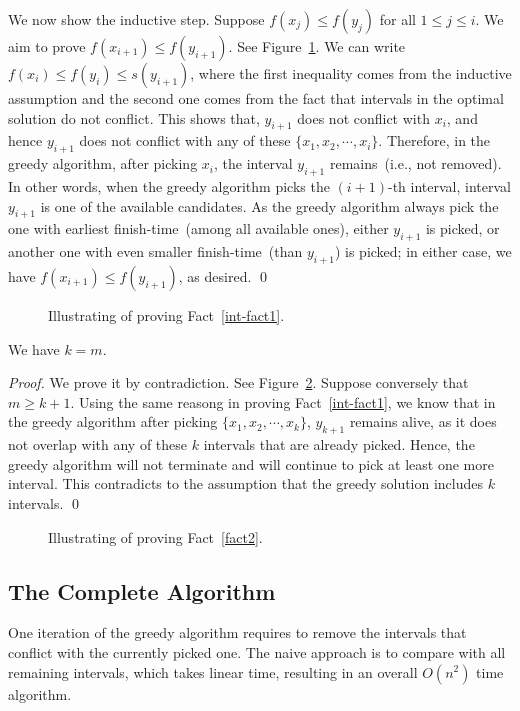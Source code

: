 We now show the inductive step. Suppose $f(x_j) \le f(y_j)$ for all $1\le j \le i$.
We aim to prove $f(x_{i+1}) \le f(y_{i+1})$. 
See Figure~\ref{fig:inductive}.
We can write $f(x_i) \le f(y_i) \le s(y_{i+1})$, 
   where the first inequality comes from the inductive assumption
   and the second one comes from the fact that intervals in the optimal solution do not conflict.
This shows that, $y_{i+1}$ does not conflict with $x_i$,
and hence $y_{i+1}$ does not conflict with any of these $\{x_1, x_2, \cdots, x_i\}$.
Therefore, in the greedy algorithm, after picking $x_i$, the interval $y_{i+1}$ remains~(i.e., not removed).
In other words, when the greedy algorithm picks the $(i+1)$-th interval, 
interval $y_{i+1}$ is one of the available candidates.
As the greedy algorithm always pick the one with earliest finish-time~(among all available ones), 
either $y_{i+1}$ is picked, or another one with even smaller finish-time~(than $y_{i+1}$) is picked;
in either case, we have $f(x_{i+1}) \le f(y_{i+1})$, as desired. \qed

\begin{figure}[h]
\centering{}
\caption{Illustrating of proving Fact~\ref{int-fact1}.}
\label{fig:inductive}
\end{figure}

\begin{fact} \label{fact2}
We have $k = m$.
\end{fact}

\emph{Proof.} We prove it by contradiction.
See Figure~\ref{fig:fact2}.  Suppose conversely that $m \ge k + 1$.
Using the same reasong in proving Fact~\ref{int-fact1},
we know that in the greedy algorithm after picking $\{x_1, x_2, \cdots, x_k\}$,
$y_{k+1}$ remains alive, as it does not overlap with any of these $k$ intervals that are already picked.
Hence, the greedy algorithm will not terminate and will continue to pick at least one more interval.
This contradicts to the assumption that the greedy solution includes $k$ intervals. \qed

\begin{figure}[h]
\centering{}
\caption{Illustrating of proving Fact~\ref{fact2}.}
\label{fig:fact2}
\end{figure}


\subsection*{The Complete Algorithm}

One iteration of the greedy algorithm requires to remove the intervals that conflict with the currently picked one.
The naive approach is to compare with all remaining intervals,
which takes linear time, resulting in an overall $O(n^2)$ time algorithm.

